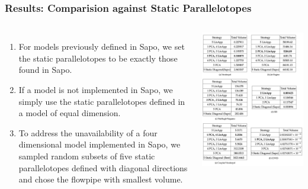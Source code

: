 \documentclass{beamer}
\begin{document}
\begin{frame}
  \frametitle{\textbf{Results:} Comparision against Static Parallelotopes}
  \begin{columns}
    \footnotesize
    \begin{enumerate}
      \item For models previously defined in Sapo, we set the static parallelotopes to be exactly those found in Sapo.
      \item If a model is not implemented in Sapo, we simply use the static parallelotopes defined in a model of equal dimension.
      \item To address the unavailability of a four dimensional model implemented in Sapo, we sampled random subsets of five static parallelotopes defined with diagonal directions and chose the flowpipe with smallest volume.
    \end{enumerate}
    \includegraphics[width=1.05\textwidth]{voltable}
  \end{columns}

\end{frame}
\end{document}
